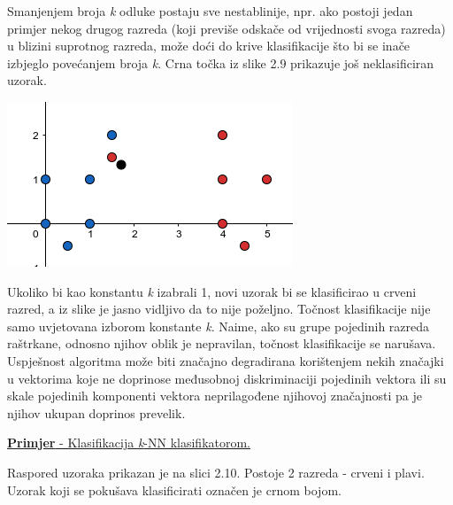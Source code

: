 \documentclass[times, utf8, zavrsni, numeric]{fer}
\begin{document}
\begin{multicols}{2}

Smanjenjem broja \textit{k} odluke postaju
sve nestablinije, npr. ako postoji jedan primjer nekog drugog 
razreda (koji previše odskače od vrijednosti svoga razreda) u blizini suprotnog razreda, 
može doći do krive klasifikacije što bi se inače izbjeglo povećanjem broja \textit{k}. 
Crna točka iz slike 2.9 prikazuje još neklasificiran uzorak. 

\begin{minipage}{\linewidth}
\vspace{10pt}
\centering
\includegraphics[width=0.8\linewidth]{img/krivo.png}
\end{minipage}

\end{multicols}

\bigbreak
Ukoliko bi kao konstantu \textit{k} izabrali 1, novi uzorak bi se klasificirao 
u crveni razred, a iz slike je jasno vidljivo da to nije poželjno. Točnost 
klasifikacije nije samo uvjetovana izborom konstante \textit{k}. Naime, 
ako su grupe pojedinih razreda raštrkane, odnosno njihov oblik je nepravilan,
točnost klasifikacije se narušava. Uspješnost algoritma može biti 
značajno degradirana korištenjem nekih značajki u vektorima koje ne 
doprinose međusobnoj diskriminaciji pojedinih vektora ili su skale pojedinih 
komponenti vektora neprilagođene njihovoj značajnosti pa je njihov ukupan doprinos prevelik. 

\newpage

\underline{\textbf{Primjer} - Klasifikacija \textit{k}-NN klasifikatorom. }

\bigbreak

Raspored uzoraka prikazan je na slici 2.10. Postoje 2 razreda - crveni i plavi. 
Uzorak koji se pokušava klasificirati označen je crnom bojom. 
\end{document}
